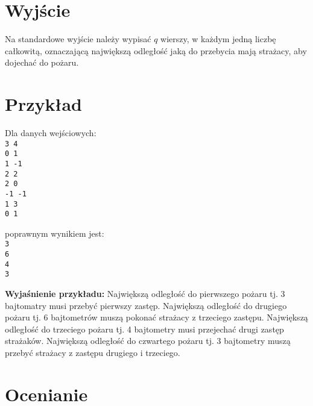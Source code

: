\documentclass[10pt]{article}
\begin{document}

    \section*{Wyjście}
    
    Na standardowe wyjście należy wypisać $q$ wierszy, w każdym jedną liczbę całkowitą, oznaczającą największą odległość jaką do przebycia mają strażacy, aby dojechać do pożaru. 


    \section*{Przykład}
    
    \noindent
    \begin{minipage}[t]{0.5\textwidth}
        Dla danych wejściowych:\vspace{1ex}\\
        \texttt{3 4\\0 1\\1 -1\\2 2\\2 0\\-1 -1\\1 3\\0 1}
    \end{minipage}
    \begin{minipage}[t]{0.5\textwidth}
        poprawnym wynikiem jest:\vspace{1ex}\\
        \texttt{3\\6\\4\\3}
    \end{minipage}
    
    \vspace{2ex}
    \noindent\textbf{Wyjaśnienie przykładu:} Największą odległość do pierwszego pożaru tj. 3 bajtomatry musi przebyć pierwszy zastęp. Największą odległość do drugiego pożaru tj. 6 bajtometrów muszą pokonać strażacy z trzeciego zastępu. Największą odległość do trzeciego pożaru tj. 4 bajtometry musi przejechać drugi zastęp strażaków. Największą odległość do czwartego pożaru tj. 3 bajtometry muszą przebyć strażacy z zastępu drugiego i trzeciego.
    

    \section*{Ocenianie}
        
\end{document}
